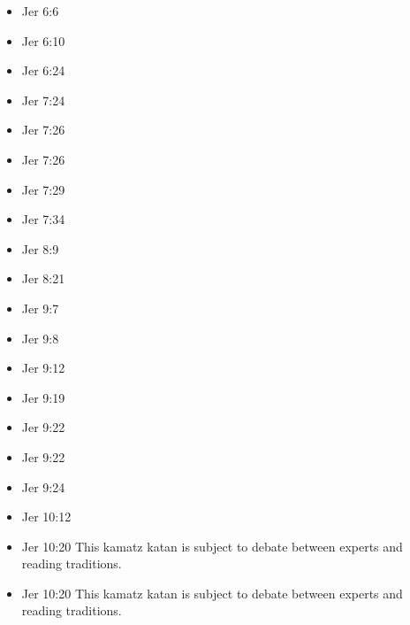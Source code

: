\documentclass[14pt]{article}
\begin{document}
\begin{multicols}{2}
\begin{itemize}
						\item Jer 6:6
						
						\item Jer 6:10
						
						\item Jer 6:24
						
						\item Jer 7:24
						
						\item Jer 7:26
						
						\item Jer 7:26
						
						\item Jer 7:29
						
						\item Jer 7:34
						
						\item Jer 8:9
						
						\item Jer 8:21
						
						\item Jer 9:7
						
						\item Jer 9:8
						
						\item Jer 9:12
						
						\item Jer 9:19
						
						\item Jer 9:22
						
						\item Jer 9:22
						
						\item Jer 9:24
						
						\item Jer 10:12
						
						\item Jer 10:20 This kamatz katan is subject to debate between experts and reading traditions.
						
						\item Jer 10:20 This kamatz katan is subject to debate between experts and reading traditions.
						

\end{itemize}
\end{multicols}
\end{document}
